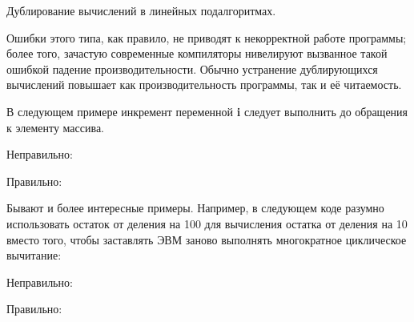 \begin{typerror}
	Дублирование вычислений в линейных подалгоритмах.

	Ошибки этого типа, как правило, не приводят к некорректной работе программы;
	более того, зачастую современные компиляторы нивелируют вызванное такой ошибкой падение производительности.
	Обычно устранение дублирующихся вычислений повышает как производительность программы, так и её читаемость.

	В следующем примере инкремент переменной \textbf{i} следует выполнить до обращения к элементу массива.

	Неправильно:

	Правильно:

	Бывают и более интересные примеры.
	Например, в следующем коде разумно использовать остаток от деления на 100 для вычисления остатка от деления на 10 вместо того, чтобы заставлять ЭВМ заново выполнять многократное циклическое вычитание:

	Неправильно:

	Правильно:

	
\end{typerror}

